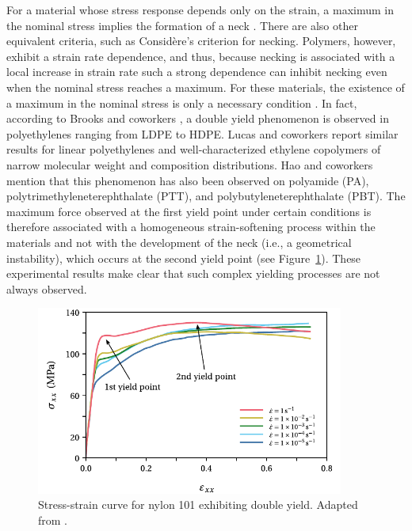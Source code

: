 For a material whose stress response depends only on the strain, a maximum in the nominal stress implies the formation of a neck \citep{wardIntroductionMechanicalProperties2004}.
There are also other equivalent criteria, such as Considère's criterion for necking.
Polymers, however, exhibit a strain rate dependence, and thus, because necking is associated with a local increase in strain rate such a strong dependence can inhibit necking even when the nominal stress reaches a maximum.
For these materials, the existence of a maximum in the nominal stress is only a necessary condition \citep{wardIntroductionMechanicalProperties2004}.
In fact, according to Brooks and coworkers \citep{brooksModelingDoubleYield1995}, a double yield phenomenon is observed in polyethylenes ranging from LDPE to HDPE.
Lucas and coworkers \citep{lucasDoubleYieldTensile1995} report similar results for linear polyethylenes and well-characterized ethylene copolymers of narrow molecular weight and composition distributions.
Hao and coworkers \citep{haoRatedependentConstitutiveModel2022} mention that this phenomenon has also been observed on polyamide (PA), polytrimethyleneterephthalate (PTT), and polybutyleneterephthalate (PBT).
The maximum force observed at the first yield point under certain conditions is therefore associated with a homogeneous strain-softening process within the materials and not with the development of the neck (i.e., a geometrical instability), which occurs at the second yield point (see Figure~\ref{fig:double_yield}).
These experimental results make clear that such complex yielding processes are not always observed.
\begin{figure}[htbp]
    \centering
    \includegraphics[width=0.9\textwidth]{figures/double_yield}
    \caption{Stress-strain curve for nylon 101 exhibiting double yield. Adapted from \cite{khanThermomechanicalResponseNylon2006}.}
\label{fig:double_yield}
\end{figure}

